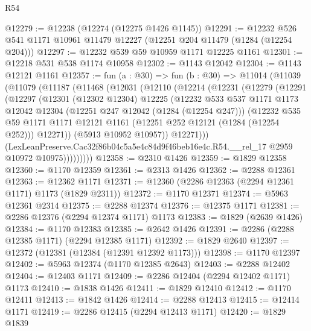 \begin{lexlean}{R54}
\begin{coremodule}
@12279 := @12238 (@12274 (@12275 @1426 @1145))
@12291 := @12232 @526 @541 @1171 @10961 @11479 @12227 (@12251 @204 @11479 (@1284 (@12254 @204)))
@12297 := @12232 @539 @59 @10959 @1171 @12225 @1161
@12301 := @12218 @531 @538 @1174 @10958
@12302 := @1143 @12042
@12304 := @1143 @12121 @1161
@12357 := fun (a : @30) =>
  fun (b : @30) =>
  @11014
    (@11039
      (@11079
        (@11187
          (@11468
            (@12031
              (@12110
                (@12214
                  (@12231
                    (@12279
                      (@12291
                        (@12297
                          (@12301
                            (@12302 @12304)
                            @12225
                            (@12232
                              @533
                              @537
                              @1171
                              @1173
                              @12042
                              @12304
                              (@12251 @247 @12042 (@1284 (@12254 @247)))
                              (@12232
                                @535
                                @59
                                @1171
                                @1171
                                @12121
                                @1161
                                (@12251 @252 @12121 (@1284 (@12254 @252)))
                                @12271))
                            (@5913 @10952 @10957))
                          @12271)))
                    (LexLeanPreserve.Cac32f86b04c5a5e4c84d9f46beb16e4c.R54.__rel_17
                      @2959
                      @10972
                      @10975)))))))))
@12358 := @2310 @1426
@12359 := @1829 @12358
@12360 := @1170 @12359
@12361 := @2313 @1426
@12362 := @2288 @12361
@12363 := @12362 @1171
@12371 := @12360 (@2286 @12363 (@2294 @12361 @1171) @1173 (@1829 @2311))
@12372 := @1170 @12371
@12374 := @5963 @12361 @2314
@12375 := @2288 @12374
@12376 := @12375 @1171
@12381 := @2286 @12376 (@2294 @12374 @1171) @1173
@12383 := @1829 (@2639 @1426)
@12384 := @1170 @12383
@12385 := @2642 @1426
@12391 := @2286 (@2288 @12385 @1171) (@2294 @12385 @1171)
@12392 := @1829 @2640
@12397 := @12372 (@12381 (@12384 (@12391 @12392 @1173)))
@12398 := @1170 @12397
@12402 := @5963 @12374 (@1170 @12385 @2643)
@12403 := @2288 @12402
@12404 := @12403 @1171
@12409 := @2286 @12404 (@2294 @12402 @1171) @1173
@12410 := @1838 @1426
@12411 := @1829 @12410
@12412 := @1170 @12411
@12413 := @1842 @1426
@12414 := @2288 @12413
@12415 := @12414 @1171
@12419 := @2286 @12415 (@2294 @12413 @1171)
@12420 := @1829 @1839

\end{coremodule}
\end{lexlean}
